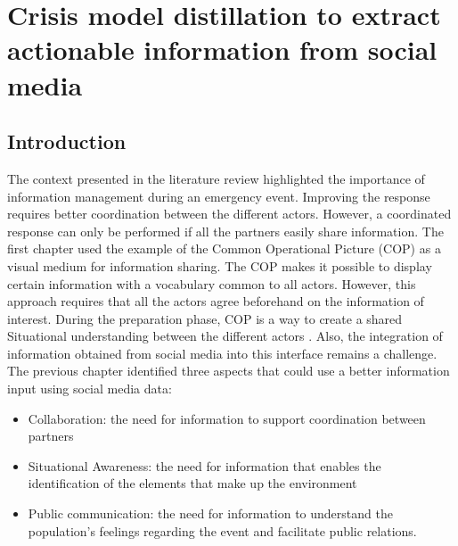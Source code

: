 \chapter{Crisis model distillation to extract actionable information from social media}

\section*{Introduction}
The context presented in the literature review highlighted the importance of information management during an emergency event.
Improving the response requires better coordination between the different actors.
However, a coordinated response can only be performed if all the partners easily share information.
The first chapter used the example of the Common Operational Picture (COP) as a visual medium for information sharing.
The COP makes it possible to display certain information with a vocabulary common to all actors.
However, this approach requires that all the actors agree beforehand on the information of interest.
During the preparation phase, COP is a way to create a shared Situational understanding between the different actors \parencite{steen-tveitCommonOperationalPicture2021}.
Also, the integration of information obtained from social media into this interface remains a challenge.
The previous chapter identified three aspects that could use a better information input using social media data:

\begin{itemize}
    \item Collaboration: the need for information to support coordination between partners
    \item Situational Awareness: the need for information that enables the identification of the elements that make up the environment
    \item Public communication: the need for information to understand the population's feelings regarding the event and facilitate public relations.
\end{itemize}


